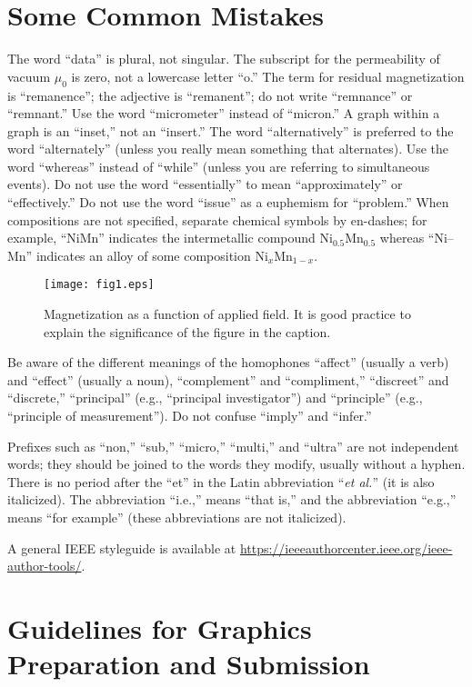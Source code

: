 \documentclass{ieeeojies}
\begin{document}
\section{Some Common Mistakes}
The word ``data'' is plural, not singular. The subscript for the 
permeability of vacuum $\mu _{0}$ is zero, not a lowercase letter 
``o.'' The term for residual magnetization is ``remanence''; the adjective 
is ``remanent''; do not write ``remnance'' or ``remnant.'' Use the word 
``micrometer'' instead of ``micron.'' A graph within a graph is an 
``inset,'' not an ``insert.'' The word ``alternatively'' is preferred to the 
word ``alternately'' (unless you really mean something that alternates). Use 
the word ``whereas'' instead of ``while'' (unless you are referring to 
simultaneous events). Do not use the word ``essentially'' to mean 
``approximately'' or ``effectively.'' Do not use the word ``issue'' as a 
euphemism for ``problem.'' When compositions are not specified, separate 
chemical symbols by en-dashes; for example, ``NiMn'' indicates the 
intermetallic compound Ni$_{0.5}$Mn$_{0.5}$ whereas 
``Ni--Mn'' indicates an alloy of some composition 
Ni$_{x}$Mn$_{1-x}$.


\begin{figure}[!t]
	\centering
	\texttt{[image: fig1.eps]}
	\caption{Magnetization as a function of applied field.
It is good practice to explain the significance of the figure in the caption.}
	\label{fig1}
\end{figure}


Be aware of the different meanings of the homophones ``affect'' (usually a 
verb) and ``effect'' (usually a noun), ``complement'' and ``compliment,'' 
``discreet'' and ``discrete,'' ``principal'' (e.g., ``principal 
investigator'') and ``principle'' (e.g., ``principle of measurement''). Do 
not confuse ``imply'' and ``infer.'' 

Prefixes such as ``non,'' ``sub,'' ``micro,'' ``multi,'' and ``ultra'' are 
not independent words; they should be joined to the words they modify, 
usually without a hyphen. There is no period after the ``et'' in the Latin 
abbreviation ``\emph{et al.}'' (it is also italicized). The abbreviation ``i.e.,'' means 
``that is,'' and the abbreviation ``e.g.,'' means ``for example'' (these 
abbreviations are not italicized).

A general IEEE styleguide is available at \underline{https://}\break\underline{ieeeauthorcenter.ieee.org/ieee-author-tools/}.

\section{Guidelines for Graphics Preparation and Submission}
\label{sec:guidelines}
\end{document}
